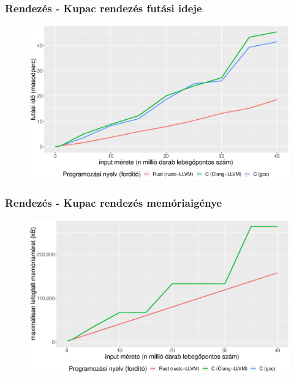 \documentclass{beamer}
\begin{document}
\begin{frame}[fragile]
\frametitle{Rendezés - Kupac rendezés futási ideje}

\begin{figure}[htb]
\begin{center}
	\includegraphics[scale=0.4]{images/heap_sort_run_without_read.eps}
\end{center}
\end{figure}

\end{frame}

\begin{frame}[fragile]
\frametitle{Rendezés - Kupac rendezés memóriaigénye}

\begin{figure}[htb]
\begin{center}
	\includegraphics[scale=0.4]{images/heap_sort_memory.eps}
\end{center}
\end{figure}

\end{frame}
\end{document}
